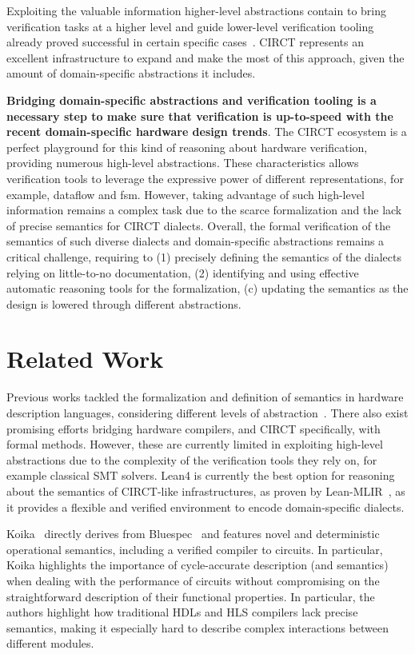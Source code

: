 \documentclass[sigconf,authorversion,nonacm, 11pt]{acmart}
\begin{document}
Exploiting the valuable information higher-level abstractions contain to bring verification 
tasks at a higher level and guide lower-level verification tooling already proved successful
in certain specific cases~\cite{huang2018instruction, chen2021leveraging, mattarei2018cosa}.
CIRCT represents an excellent infrastructure to expand and make the most of this approach, 
given the amount of domain-specific abstractions it includes.

\textbf{Bridging domain-specific abstractions and 
verification tooling is a necessary step to make sure that 
verification is up-to-speed with the recent domain-specific hardware 
design trends}. 
The CIRCT ecosystem is a perfect playground for this kind of reasoning 
about hardware verification, providing numerous high-level abstractions.
These characteristics allows verification tools to leverage the 
expressive power of different representations, for example, dataflow and \ac{fsm}. 
However, taking advantage of such high-level information remains a complex task due 
to the scarce formalization and the lack of precise 
semantics for CIRCT dialects. 
Overall, the formal verification of the semantics of such diverse dialects 
and domain-specific abstractions remains a critical challenge, 
requiring to
(1) precisely defining the semantics of the dialects relying on little-to-no documentation, 
(2) identifying and using effective automatic reasoning tools for the formalization, 
(c) updating the semantics as the design is lowered through different abstractions. 


\section{Related Work}

Previous works tackled the formalization and definition of semantics in hardware description languages, considering different levels of abstraction~\cite{melham1988abstraction}. 
There also exist promising efforts bridging hardware compilers, and CIRCT specifically, with formal methods. 
However, these are currently limited in exploiting high-level abstractions due to the complexity of the verification tools they rely on, 
for example classical SMT solvers.
Lean4 is currently the best option for reasoning about the semantics of CIRCT-like infrastructures, as proven by Lean-MLIR~\cite{bhat2024verifying}, 
as it provides a flexible and verified environment to encode domain-specific dialects.

Koika~\cite{bourgeat2020essence} directly derives from Bluespec~\cite{bluespec} and features novel and deterministic operational semantics, 
including a verified compiler to circuits. In particular, Koika highlights the importance of cycle-accurate description (and semantics) 
when dealing with the performance of circuits without compromising on the straightforward description of their functional properties. 
In particular, the authors highlight how traditional HDLs and HLS compilers lack precise semantics, making it especially hard to 
describe complex interactions between different modules.
\end{document}
